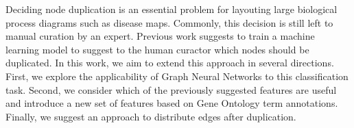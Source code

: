 \documentclass[
	fontsize=10pt, %
	twoside=true, %
	secnumdepth=1, %
  toc=indentunnumbered %
]{kaobook}
\begin{document}







Deciding node duplication is an essential problem for
layouting large biological process diagrams such as disease maps. 
Commonly, this decision is still left to manual curation by an expert. Previous
work
\cite{nielsen_MachineLearningSupport_2019}
suggests to train a machine learning model to suggest to the human curactor
which nodes should be duplicated. In this work, we aim to extend this
approach in several directions. First, we explore the applicability of Graph
Neural Networks to this classification task. Second, we consider which of the
previously suggested features are useful and introduce a new set of features
based on Gene Ontology term annotations. Finally, we suggest an approach to
distribute edges after duplication.
\end{document}
